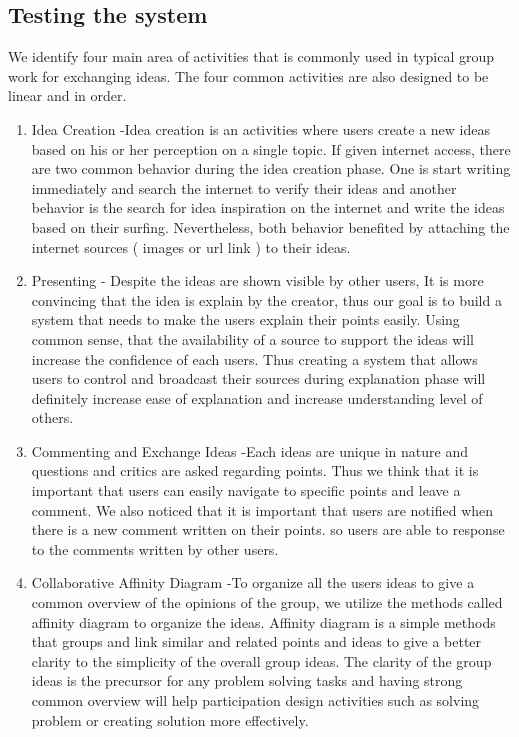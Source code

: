 \documentclass{sigchi}
\begin{document}
\begin{itemize}
\begin{itemize}
\subsection{Testing the system}
We identify four main area of activities  that is commonly used  in typical group work for exchanging ideas. The four common activities are also designed to be linear and in order. 

\begin{enumerate}
\item Idea Creation -Idea creation is an activities where users create a new ideas based on his or her perception on a single topic. If given internet access, there are two common behavior during the idea creation phase. One is start  writing immediately and search the internet to verify their ideas and another behavior is the search for idea inspiration on the internet and write the ideas based on their surfing. Nevertheless, both behavior benefited by attaching the internet sources ( images or url link ) to their ideas. 
\item Presenting - Despite the ideas are shown visible by other users, It is more convincing that the idea is explain by the creator, thus our goal is to build a system that needs to make the users explain their points easily. Using common sense, that the availability of a source to support the ideas will increase the confidence of each users. Thus creating a system that allows users to control and broadcast their sources during explanation phase will definitely increase ease of explanation and increase understanding level of others. 
\item Commenting and Exchange Ideas -Each ideas are unique in nature and questions and critics are asked regarding points. Thus we think that it is important that users can easily navigate to specific points and leave a comment. We also noticed that it is important that users are notified when there is a new comment written on their points. so users are able to response to the comments written by other users. 
\item Collaborative Affinity Diagram -To organize all the users ideas to give a common overview of the opinions of the group, we utilize the methods called affinity diagram to organize the ideas. Affinity diagram is a simple methods that groups and link similar and related points and ideas to give a better clarity to the simplicity of the overall group ideas. The clarity of the group ideas is the precursor for any problem solving tasks and having strong common overview will help participation design activities such as solving problem or creating solution more effectively. 
\end{enumerate}


\end{itemize}
\end{itemize}
\end{document}
